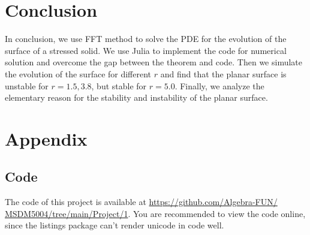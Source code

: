 \documentclass[runningheads]{llncs}
\begin{document}
\section{Conclusion}

In conclusion, we use FFT method to solve the PDE for the evolution of the surface of a stressed solid. 
We use Julia to implement the code for numerical solution and overcome the gap between the theorem and code.
Then we simulate the evolution of the surface for different $r$ and find that the planar surface is unstable for $r=1.5,3.8$, but stable for $r=5.0$.
Finally, we analyze the elementary reason for the stability and instability of the planar surface.






\newpage
\section*{Appendix}
\subsection*{Code}

The code of this project is available at \url{https://github.com/Algebra-FUN/
MSDM5004/tree/main/Project/1}. You are recommended to view the code online, since the listings package can't render unicode in code well.




\end{document}
